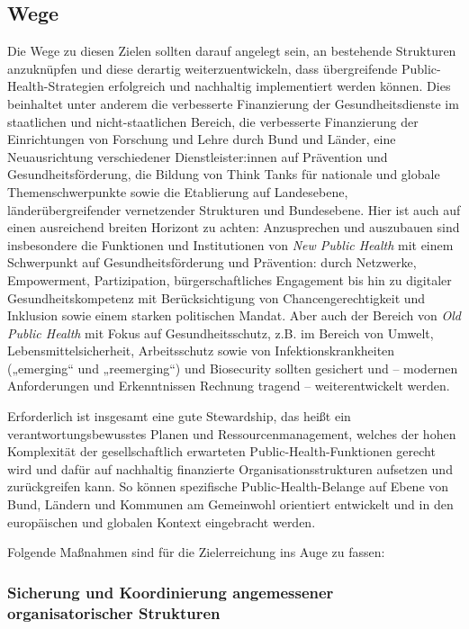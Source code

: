 \documentclass{article}
\begin{document}
\subsection{Wege}\label{H6851907}



Die Wege zu diesen Zielen sollten darauf angelegt sein, an bestehende Strukturen anzuknüpfen und diese derartig weiterzuentwickeln, dass übergreifende Public-Health-Strategien erfolgreich und nachhaltig implementiert werden können. Dies beinhaltet unter anderem die verbesserte Finanzierung der Gesundheitsdienste im staatlichen und nicht-staatlichen Bereich, die verbesserte Finanzierung der Einrichtungen von Forschung und Lehre durch Bund und Länder, eine Neuausrichtung verschiedener Dienstleister:innen auf Prävention und Gesundheitsförderung, die Bildung von Think Tanks für nationale und globale Themenschwerpunkte sowie die Etablierung auf Landesebene, länderübergreifender vernetzender Strukturen und Bundesebene. Hier ist auch auf einen ausreichend breiten Horizont zu achten: Anzusprechen und auszubauen sind insbesondere die Funktionen und Institutionen von \emph{New Public Health} mit einem Schwerpunkt auf Gesundheitsförderung und Prävention: durch Netzwerke, Empowerment, Partizipation, bürgerschaftliches Engagement bis hin zu digitaler Gesundheitskompetenz mit Berücksichtigung von Chancengerechtigkeit und Inklusion sowie einem starken politischen Mandat. Aber auch der Bereich von \emph{Old Public Health} mit Fokus auf Gesundheitsschutz, z.B. im Bereich von Umwelt, Lebensmittelsicherheit, Arbeitsschutz sowie von Infektionskrankheiten („emerging“ und „reemerging“) und Biosecurity sollten gesichert und – modernen Anforderungen und Erkenntnissen Rechnung tragend – weiterentwickelt werden.


Erforderlich ist insgesamt eine gute Stewardship, das heißt ein verantwortungsbewusstes Planen und Ressourcenmanagement, welches der hohen Komplexität der gesellschaftlich erwarteten Public-Health-Funktionen gerecht wird und dafür auf nachhaltig finanzierte Organisationsstrukturen aufsetzen und zurückgreifen kann. So können spezifische Public-Health-Belange auf Ebene von Bund, Ländern und Kommunen am Gemeinwohl orientiert entwickelt und in den europäischen und globalen Kontext eingebracht werden. 


Folgende Maßnahmen sind für die Zielerreichung ins Auge zu fassen:


\subsubsection{Sicherung und Koordinierung angemessener organisatorischer Strukturen}\label{H4597495}
\end{document}
